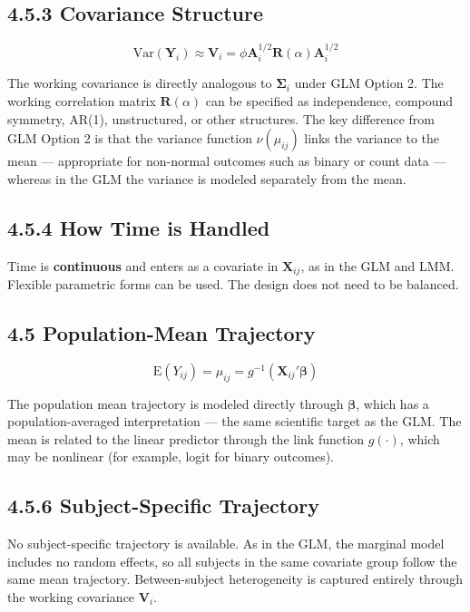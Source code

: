 \documentclass[11pt]{article}
\newcommand{\bY}{\mathbf{Y}}
\newcommand{\bbeta}{\boldsymbol{\beta}}
\newcommand{\bSigma}{\boldsymbol{\Sigma}}
\newcommand{\E}{\mathrm{E}}
\newcommand{\Var}{\mathrm{Var}}
\begin{document}
\subsection*{4.5.3 Covariance Structure}

$$\Var(\bY_i) \approx \mathbf{V}_i = \phi\mathbf{A}_i^{1/2}\mathbf{R}(\alpha)\mathbf{A}_i^{1/2}$$

The working covariance is directly analogous to $\bSigma_i$ under GLM Option 2. The working correlation matrix $\mathbf{R}(\alpha)$ can be specified as independence, compound symmetry, AR(1), unstructured, or other structures. The key difference from GLM Option 2 is that the variance function $\nu(\mu_{ij})$ links the variance to the mean --- appropriate for non-normal outcomes such as binary or count data --- whereas in the GLM the variance is modeled separately from the mean.

\subsection*{4.5.4 How Time is Handled}

Time is \textbf{continuous} and enters as a covariate in $\mathbf{X}_{ij}$, as in the GLM and LMM. Flexible parametric forms can be used. The design does not need to be balanced.

\subsection*{4.5 Population-Mean Trajectory}

$$\E(Y_{ij}) = \mu_{ij} = g^{-1}(\mathbf{X}_{ij}'\bbeta)$$

The population mean trajectory is modeled directly through $\bbeta$, which has a population-averaged interpretation --- the same scientific target as the GLM. The mean is related to the linear predictor through the link function $g(\cdot)$, which may be nonlinear (for example, logit for binary outcomes).

\subsection*{4.5.6 Subject-Specific Trajectory}

No subject-specific trajectory is available. As in the GLM, the marginal model includes no random effects, so all subjects in the same covariate group follow the same mean trajectory. Between-subject heterogeneity is captured entirely through the working covariance $\mathbf{V}_i$.
\end{document}
